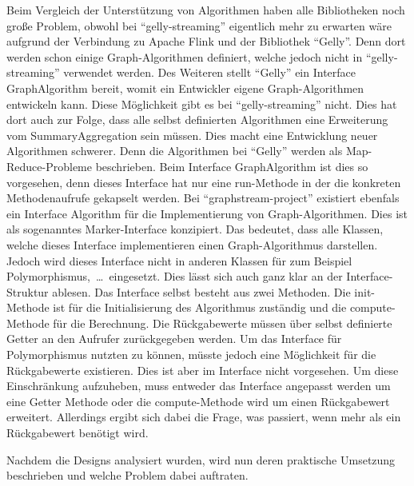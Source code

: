 Beim Vergleich der Unterstützung von Algorithmen haben alle Bibliotheken noch
große Problem, obwohl bei \enquote{gelly-streaming} eigentlich mehr zu erwarten
wäre aufgrund der Verbindung zu Apache Flink und der Bibliothek \enquote{Gelly}.
Denn dort werden schon einige Graph-Algorithmen definiert, welche jedoch nicht in
\enquote{gelly-streaming} verwendet werden. Des Weiteren stellt \enquote{Gelly}
ein Interface GraphAlgorithm bereit, womit ein Entwickler eigene Graph-Algorithmen
entwickeln kann. Diese Möglichkeit gibt es bei \enquote{gelly-streaming} nicht.
Dies hat dort auch zur Folge, dass alle selbst definierten Algorithmen eine
Erweiterung vom SummaryAggregation sein müssen. Dies macht eine Entwicklung
neuer Algorithmen schwerer. Denn die Algorithmen bei \enquote{Gelly} werden als
Map-Reduce-Probleme beschrieben. Beim Interface GraphAlgorithm ist dies so vorgesehen,
denn dieses Interface hat nur eine run-Methode in der die konkreten
Methodenaufrufe gekapselt werden. Bei \enquote{graphstream-project} existiert
ebenfals ein Interface Algorithm für die Implementierung von Graph-Algorithmen.
Dies ist als sogenanntes Marker-Interface konzipiert. Das bedeutet, dass alle
Klassen, welche dieses Interface implementieren einen Graph-Algorithmus darstellen.
Jedoch wird dieses Interface nicht in anderen Klassen für zum Beispiel
Polymorphismus,~\dots~eingesetzt. Dies lässt sich auch ganz klar an der
Interface-Struktur ablesen. Das Interface selbst besteht aus zwei Methoden.
Die init-Methode ist für die Initialisierung des Algorithmus zuständig und die
compute-Methode für die Berechnung. Die Rückgabewerte müssen über selbst
definierte Getter an den Aufrufer zurückgegeben werden. Um das Interface für
Polymorphismus nutzten zu können, müsste jedoch eine Möglichkeit für die
Rückgabewerte existieren. Dies ist aber im Interface nicht vorgesehen. Um diese
Einschränkung aufzuheben, muss entweder das Interface angepasst werden um eine
Getter Methode oder die compute-Methode wird um einen Rückgabewert erweitert.
Allerdings ergibt sich dabei die Frage, was passiert, wenn mehr als ein
Rückgabewert benötigt wird.

Nachdem die Designs analysiert wurden, wird nun deren praktische Umsetzung
beschrieben und welche Problem dabei auftraten.
